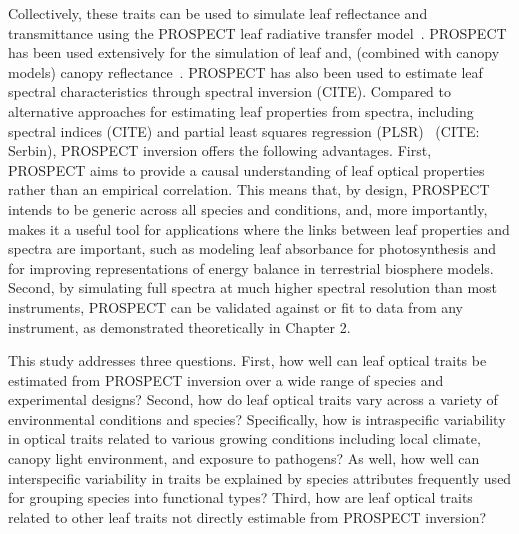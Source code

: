 
Collectively, these traits can be used to simulate leaf reflectance and transmittance using the PROSPECT leaf radiative transfer model~\cite{jacquemoud1990_prospect,feret2008_prospect,feret2017_prospectd}.
PROSPECT has been used extensively for the simulation of leaf and, (combined with canopy models) canopy reflectance~\cite{jacquemoud_2009_prosail}.
PROSPECT has also been used to estimate leaf spectral characteristics through spectral inversion (CITE).
Compared to alternative approaches for estimating leaf properties from spectra, including spectral indices (CITE) and partial least squares regression (PLSR)~\cite{barnes_2017_beyond} (CITE: Serbin), PROSPECT inversion offers the following advantages.
First, PROSPECT aims to provide a causal understanding of leaf optical properties rather than an empirical correlation.
This means that, by design, PROSPECT intends to be generic across all species and conditions, and, more importantly, makes it a useful tool for applications where the links between leaf properties and spectra are important, such as modeling leaf absorbance for photosynthesis and for improving representations of energy balance in terrestrial biosphere models.
Second, by simulating full spectra at much higher spectral resolution than most instruments, PROSPECT can be validated against or fit to data from any instrument, as demonstrated theoretically in Chapter 2.

This study addresses three questions.
First, how well can leaf optical traits be estimated from PROSPECT inversion over a wide range of species and experimental designs?
Second, how do leaf optical traits vary across a variety of environmental conditions and species?
Specifically, how is intraspecific variability in optical traits related to various growing conditions including local climate, canopy light environment, and exposure to pathogens?
As well, how well can interspecific variability in traits be explained by species attributes frequently used for grouping species into functional types? 
Third, how are leaf optical traits related to other leaf traits not directly estimable from PROSPECT inversion?

